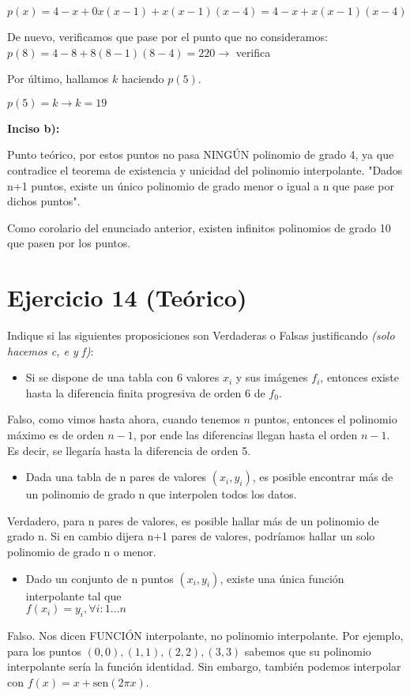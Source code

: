 \documentclass[11pt]{article}
\def\sen{\mathrm{sen}}
\begin{document}
	$p(x)=4-x+0x(x-1)+x(x-1)(x-4)=4-x+x(x-1)(x-4)$
	
	De nuevo, verificamos que pase por el punto que no consideramos: $p(8)=4-8+8(8-1)(8-4)=220 \rightarrow$ verifica
	
	Por último, hallamos $k$ haciendo $p(5)$.
	
	$p(5)=k \rightarrow k=19$
	
	\textbf{Inciso b):}
	
	Punto teórico, por estos puntos no pasa NINGÚN polinomio de grado 4, ya que contradice el teorema de existencia y unicidad del polinomio interpolante. "Dados n+1 puntos, existe un único polinomio de grado menor o igual a n que pase por dichos puntos".
	
	Como corolario del enunciado anterior, existen infinitos polinomios de grado 10 que pasen por los puntos.
	
	\section{Ejercicio 14 (Teórico)}
	Indique si las siguientes proposiciones son Verdaderas o Falsas justificando \textit{(solo hacemos c, e y f)}:
	
	\begin{itemize}
		\item Si se dispone de una tabla con 6 valores $x_i$ y sus imágenes $f_i$, entonces existe hasta la diferencia finita progresiva de orden 6 de $f_0$.
	\end{itemize}

	Falso, como vimos hasta ahora, cuando tenemos $n$ puntos, entonces el polinomio máximo es de orden $n-1$, por ende las diferencias llegan hasta el orden $n-1$. Es decir, se llegaría hasta la diferencia de orden 5.

	\begin{itemize}
		\item Dada una tabla de n pares de valores $(x_i,y_i)$, es posible encontrar más de un polinomio de grado n que interpolen todos los datos.
	\end{itemize}

	Verdadero, para n pares de valores, es posible hallar más de un polinomio de grado n. Si en cambio dijera n+1 pares de valores, podríamos hallar un solo polinomio de grado n o menor.
	
	\begin{itemize}
		\item Dado un conjunto de n puntos $(x_i,y_i)$, existe una única función interpolante tal que \\ $f(x_i)=y_i, \forall i:1\dots n$
	\end{itemize}
	Falso. Nos dicen FUNCIÓN interpolante, no polinomio interpolante. Por ejemplo, para los puntos $(0,0), (1,1), (2,2), (3,3)$	sabemos que su polinomio interpolante sería la función identidad. Sin embargo, también podemos interpolar con $f(x)=x+\sen(2\pi x)$.
	
\end{document}
